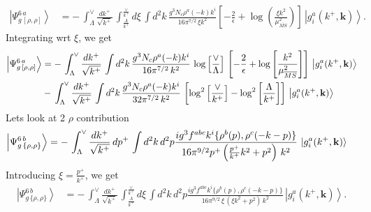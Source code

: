 \documentclass[10pt]{article}
\numberwithin{equation}{section}
\begin{document}
\begin{align}
\left|\Psi_{g\,[\rho,\rho]}^{6\, a}\right\rangle & = -\, \int_{\Lambda}^{\vee} \frac{dk^{+}}{\sqrt{k^{+}}}\,\int_{\frac{\Lambda}{k^{+}}}^{\frac{\vee}{k^{+}}} d\xi\, \int d^{2}k\, \frac{g^{3}N_{c}\rho^{a}(-k)k^{i}}{16\pi^{7/2}\,\xi k^{2}}\left[-\frac{2}{\epsilon}+\log{\left(\frac{\xi k^{2}}{\mu^{2}_{\overline{MS}}}\right)}\right]\, \left|g_{i}^{a}(k^{+},\mathbf{k})\right\rangle.
\end{align}
Integrating wrt $\xi$, we get
\begin{align}\label{onerhopart}
    \left|\Psi_{g\,[\rho,\rho]}^{6\, a}\right\rangle & = -\, \int_{\Lambda}^{\vee} \frac{dk^{+}}{\sqrt{k^{+}}}\, \int d^{2}k\, \frac{g^{3}N_{c}\rho^{a}(-k)k^{i}}{16\pi^{7/2}\, k^{2}}\,\log{\left[\frac{\vee}{\Lambda}\right]}\,\left[-\frac{2}{\epsilon} + \log{\left[\frac{k^{2}}{\mu^{2}_{\overline{MS}}}\right]}\right]\,\left|g_{i}^{a}(k^{+},\mathbf{k})\right\rangle\notag \\ & -\, \int_{\Lambda}^{\vee} \frac{dk^{+}}{\sqrt{k^{+}}}\, \int d^{2}k\, \frac{g^{3}N_{c}\rho^{a}(-k)k^{i}}{32\pi^{7/2}\, k^{2}}\,\left[\log^{2}{\left[\frac{\vee}{k^{+}}\right]} - \log^{2}{\left[\frac{\Lambda}{k^{+}}\right]}\right]\,\left|g_{i}^{a}(k^{+},\mathbf{k})\right\rangle
\end{align}
Lets look at 2 $\rho$ contribution
\begin{align}
\left|\Psi_{g\,\{\rho,\rho\}}^{6\, b}\right\rangle & = -\,\int_{\Lambda}^{\vee} \frac{dk^{+}}{\sqrt{k^{+}}}\, dp^{+}\, \int d^{2}k \, d^{2}p \frac{ig^{3}f^{abc}k^{i}\{\rho^{b}(p),\rho^{c}(-k-p)\}}{16\pi^{9/2}p^{+}\left(\frac{p^{+}}{k^{+}}k^{2}+p^{2}\right)\,k^{2}}\, \ket{g^{a}_{i}(k^{+},\mathbf{k})}
\end{align}
Introducing $\xi = \frac{p^{+}}{k^{+}}$, we get
\begin{align}
    \left|\Psi_{g\,\{\rho,\rho\}}^{6\, b}\right\rangle & =-\,\int_{\Lambda}^{\vee} \frac{dk^{+}}{\sqrt{k^{+}}}\, \int_{\frac{\Lambda}{k^{+}}}^{\frac{\vee}{k^{+}}}d\xi\, \int d^{2}k \, d^{2}p \frac{ig^{3}f^{abc}k^{i}\{\rho^{b}(p),\rho^{c}(-k-p)\}}{16\pi^{9/2}\,\xi\,\left(\xi k^{2}+p^{2}\right)\,k^{2}}\, \left|g_{i}^{a}(k^{+},\mathbf{k})\right\rangle.
\end{align}
\end{document}
